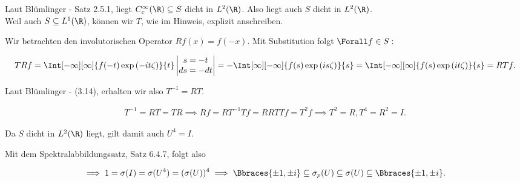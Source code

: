 \begin{solution}

Laut Blümlinger - Satz 2.5.1, liegt $C_c^\infty(\R) \subseteq S$ dicht in $L^2(\R)$.
Also liegt auch $S$ dicht in $L^2(\R)$. \\

Weil auch $S \subseteq L^1(\R)$, können wir $T$, wie im Hinweis, explizit anschreiben. \\


Wir betrachten den involutorischen Operator $R f(x) = f(-x)$.
Mit Substitution folgt $\Forall f \in S:$

\begin{align*}
  T R f
  =
  \Int[-\infty][\infty]
  {f(-t) \exp{(-i t \zeta)}}{t}
  \begin{vmatrix}
    s = -t \\
    ds = -dt
  \end{vmatrix}
  =
  -\Int[\infty][-\infty]{f(s) \exp{(i s \zeta)}}{s}
  =
  \Int[-\infty][\infty]{f(s) \exp{(i t \zeta)}}{s}
  =
  R T f.
\end{align*}

Laut Blümlinger - (3.14), erhalten wir also $T^{-1} = R T$.

\begin{align*}
  T^{-1} = R T = T R
  \implies
  R f = R T^{-1} T f = R R T T f = T^2 f
  \implies
  T^2 = R, T^4 = R^2 = I.
\end{align*}

Da $S$ dicht in $L^2(\R)$ liegt, gilt damit auch $U^4 = I$.


Mit dem Spektralabbildungssatz, Satz 6.4.7, folgt also

\begin{align*}
  \implies
  1 = \sigma(I) = \sigma(U^4) = (\sigma(U))^4
  \implies
  \Bbraces{\pm 1, \pm i}
  \subseteq
  \sigma_p(U)
  \subseteq
  \sigma(U)
  \subseteq
  \Bbraces{\pm 1, \pm i}.
\end{align*}

\end{solution}
